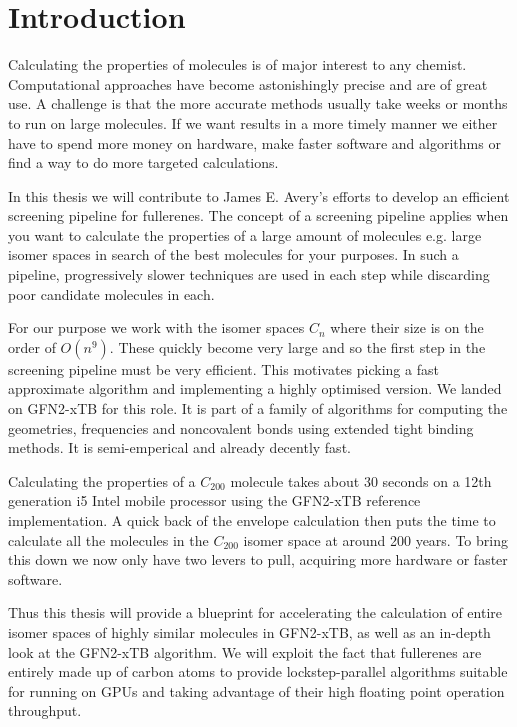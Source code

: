 \chapter{Introduction}
Calculating the properties of molecules is of major interest to any chemist. Computational approaches have become astonishingly precise and are of great use. A challenge is that the more accurate methods usually take weeks or months to run on large molecules. If we want results in a more timely manner we either have to spend more money on hardware, make faster software and algorithms or find a way to do more targeted calculations. 

In this thesis we will contribute to James E. Avery's efforts to develop an efficient screening pipeline for fullerenes. The concept of a screening pipeline applies when you want to calculate the properties of a large amount of molecules e.g. large isomer spaces in search of the best molecules for your purposes. In such a pipeline, progressively slower techniques are used in each step while discarding poor candidate molecules in each. 

For our purpose we work with the isomer spaces $C_n$ where their size is on the order of $O(n^9)$.
These quickly become very large and so the first step in the screening pipeline must be very efficient. This motivates picking a fast approximate algorithm and implementing a highly optimised version.
We landed on GFN2-xTB for this role. It is part of a family of algorithms for computing the geometries, frequencies and noncovalent bonds using extended tight binding methods. It is semi-emperical and already decently fast. 

Calculating the properties of a $C_{200}$ molecule takes about 30 seconds on a 12th generation i5 Intel mobile processor using the GFN2-xTB reference implementation. A quick back of the envelope calculation then puts the time to calculate all the molecules in the $C_{200}$ isomer space at around 200 years. To bring this down we now only have two levers to pull, acquiring more hardware or faster software. 

Thus this thesis will provide a blueprint for accelerating the calculation of entire isomer spaces of highly similar molecules in GFN2-xTB, as well as an in-depth look at the GFN2-xTB algorithm. We will exploit the fact that fullerenes are entirely made up of carbon atoms to provide lockstep-parallel algorithms suitable for running on GPUs and taking advantage of their high floating point operation throughput.

